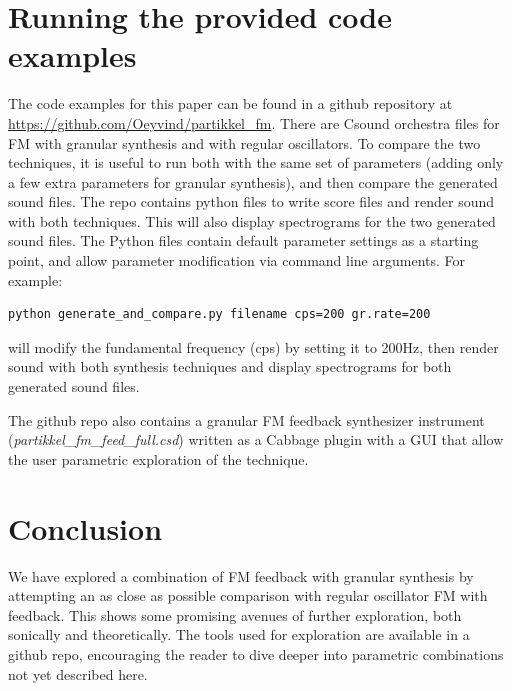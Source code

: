 \documentclass[runningheads,a4paper]{llncs}
\begin{document}
\section{Running the provided code examples}
The code examples for this paper can be found in a github repository at \url{https://github.com/Oeyvind/partikkel_fm}. There are Csound orchestra files for FM with granular synthesis and with regular oscillators. To compare the two techniques, it is useful to run both with the same set of parameters (adding only a few extra parameters for granular synthesis), and then compare the generated sound files. The repo contains python files to write score files and render sound with both techniques. This will also display spectrograms for the two generated sound files. The Python files contain default parameter settings as a starting point, and allow parameter modification via command line arguments. For example:
\begin{lstlisting}
python generate_and_compare.py filename cps=200 gr.rate=200
\end{lstlisting}
will modify the fundamental frequency (cps) by setting it to 200Hz, then render sound with both synthesis techniques and display spectrograms for both generated sound files. 

The github repo also contains a granular FM feedback synthesizer instrument (\emph{partikkel\_fm\_feed\_full.csd}) written as a Cabbage plugin with a GUI that allow the user parametric exploration of the technique.

\section{Conclusion}
We have explored a combination of FM feedback with granular synthesis by attempting an as close as possible comparison with regular oscillator FM with feedback. This shows some promising avenues of further exploration, both sonically and theoretically. The tools used for exploration are available in a github repo, encouraging the reader to dive deeper into parametric combinations not yet described here.
\end{document}
